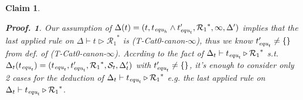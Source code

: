 \documentclass[12pt]{article}
\newtheorem{Claim}{Claim}[section]
\newtheorem{Proof}{Proof.}
\begin{document}
\begin{Claim}
\begin{Proof}
    Our assumption of $\Delta(t) = (t, t_{\text{\it equ}_h} \wedge
    t'_{\text{\it equ}_t}, {\mathcal{R}_1}^*, \infty, \Delta' )$ implies
    that the last applied rule on
    $\Delta \vdash t \triangleright {\mathcal{R}_1}^*$ is
    (T-Cat0-canon-$\infty$), thus we know
    $t'_{\text{\it equ}_t} \neq \{\}$ from def. of (T-Cat0-canon-$\infty$).
    Accrding to the fact of
    $\Delta_t \vdash t_{\text{\it equ}_t} \triangleright {\mathcal{R}_1}^*$
    s.t. $\Delta_t(t_{\text{\it equ}_t}) =(t_{\text{\it equ}_t},
    t'_{\text{\it equ}_t}, {\mathcal{R}_1}^*, \mathcal{S}_t, \Delta'_t)$
    with $t'_{\text{\it equ}_t} \neq \{\}$, it's enough to consider
    only 2 cases for the deduction of
    $\Delta_t \vdash t_{\text{\it equ}_t} \triangleright {\mathcal{R}_1}^*$
    e.g. the last applied rule on
    $\Delta_t \vdash t_{\text{\it equ}_t} \triangleright {\mathcal{R}_1}^*$.
    

\end{Proof}
\end{Claim}
\end{document}
